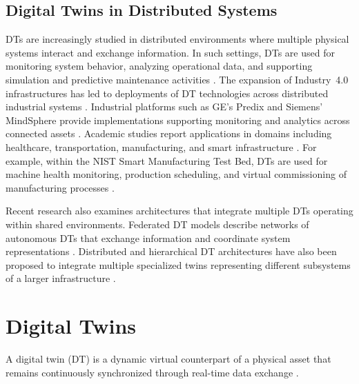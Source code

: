 \subsection{Digital Twins in Distributed Systems}

DTs are increasingly studied in distributed environments where multiple physical systems interact and exchange information. In such settings, DTs are used for monitoring system behavior, analyzing operational data, and supporting simulation and predictive maintenance activities \cite{negri2017review, tao2018digital}. The expansion of Industry~4.0 infrastructures has led to deployments of DT technologies across distributed industrial systems \cite{liu2021review}. Industrial platforms such as GE's Predix and Siemens' MindSphere provide implementations supporting monitoring and analytics across connected assets \cite{gepredixoverview, siemensmindsphere}. Academic studies report applications in domains including healthcare, transportation, manufacturing, and smart infrastructure \cite{barricelli2019survey, botin2022digital}. For example, within the NIST Smart Manufacturing Test Bed, DTs are used for machine health monitoring, production scheduling, and virtual commissioning of manufacturing processes \cite{shao2021use}.

Recent research also examines architectures that integrate multiple DTs operating within shared environments. Federated DT models describe networks of autonomous DTs that exchange information and coordinate system representations \cite{vergara2023federated}. Distributed and hierarchical DT architectures have also been proposed to integrate multiple specialized twins representing different subsystems of a larger infrastructure \cite{kunnari2025distributed}.

















\section{Digital Twins}\label{sec:background-dt}

A digital twin (DT) is a dynamic virtual counterpart of a physical asset that remains continuously synchronized through real-time data exchange \cite{kritzinger2018digital}.

